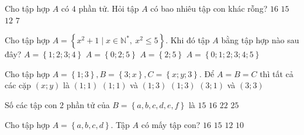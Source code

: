 \begin{ex}%
	Cho tập hợp $A$ có $4$ phần tử. Hỏi tập $A$ có bao nhiêu tập con  khác rỗng?
	 \choice
		{$16$} 
		{\True  $15$}
		{$12$} 
		 {$7$}
\end{ex}

\begin{ex}%
	Cho tập  hợp $A=\left\{x^2+1\mid x\in \mathbb{N}^{*},\ x^2\le 5\right\}$. Khi đó tập $A$ bằng tập hợp nào sau đây?
	 \choice
		 {$A=\left\{1;2;3;4\right\}$}
		 {$A=\left\{0;2;5\right\}$}
		{\True $A=\left\{2;5\right\}$} 
		 {$A=\left\{0;1;2;3;4;5\right\}$}
\end{ex}

\begin{ex}%
	Cho tập hợp  $A=\left\{1;3\right\},B=\left\{3;x\right\},C=\left\{x;y;3\right\}$. Để $A=B=C$ thì tất cả các cặp $\left(x;y\right)$ là
	\choice 
		 {$\left(1;1\right)$}
		{\True $\left(1;1\right)$ và $\left(1;3\right)$} 
		{$\left(1;3\right)$} 
		{$\left(3;1\right)$ và  $\left(3;3\right)$}
\end{ex}

\begin{ex}%
	Số các tập con $2$ phần tử của $B=\left\{a,b,c,d,e,f\right\}$  là
	 \choice
		{\True  $15$}
		 {$16$}
		{$22$} 
		{$25$} 
\end{ex}

\begin{ex}%
	Cho  tập hợp $A=\left\{a,b,c,d\right\}$. Tập $A$ có mấy tập con?
	 \choice
		{\True  $16$}
		 {$15$}
		{$12$} 
		 {$10$}
\end{ex}

